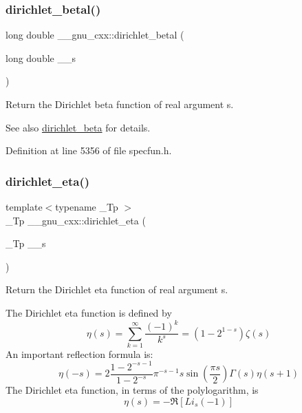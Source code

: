\subsubsection{\texorpdfstring{dirichlet\+\_\+betal()}{dirichlet\_betal()}}
{\footnotesize\ttfamily long double \+\_\+\+\_\+gnu\+\_\+cxx\+::dirichlet\+\_\+betal (\begin{DoxyParamCaption}\item[{long double}]{\+\_\+\+\_\+s }\end{DoxyParamCaption})\hspace{0.3cm}{\ttfamily [inline]}}

Return the Dirichlet beta function of real argument {\ttfamily s}.

\begin{DoxySeeAlso}{See also}
\hyperlink{group__mathsf__gnu_ga87466a2d429a2815d794acc21c882b08}{dirichlet\+\_\+beta} for details. 
\end{DoxySeeAlso}


Definition at line 5356 of file specfun.\+h.

\mbox{\label{group__mathsf__gnu_gae46e26e4107675d285c79a2d6202e6c7}} 
\subsubsection{\texorpdfstring{dirichlet\+\_\+eta()}{dirichlet\_eta()}}
{\footnotesize\ttfamily template$<$typename \+\_\+\+Tp $>$ \\
\+\_\+\+Tp \+\_\+\+\_\+gnu\+\_\+cxx\+::dirichlet\+\_\+eta (\begin{DoxyParamCaption}\item[{\+\_\+\+Tp}]{\+\_\+\+\_\+s }\end{DoxyParamCaption})\hspace{0.3cm}{\ttfamily [inline]}}

Return the Dirichlet eta function of real argument {\ttfamily s}.

The Dirichlet eta function is defined by \[ \eta(s) = \sum_{k=1}^\infty \frac{(-1)^k}{k^s} = \left( 1 - 2^{1-s} \right) \zeta(s) \] An important reflection formula is\+: \[ \eta(-s) = 2 \frac{1-2^{-s-1}}{1-2^{-s}} \pi^{-s-1} s \sin(\frac{\pi s}{2}) \Gamma(s) \eta(s+1) \] The Dirichlet eta function, in terms of the polylogarithm, is \[ \eta(s) = -\Re[Li_s(-1)] \]


